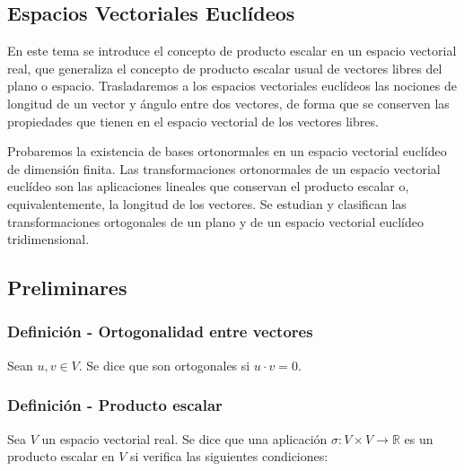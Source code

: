\documentclass[12pt, a4paper, ones, notitlepage, openany,titlepage]{article}
\begin{document}
\newpage

\begin{center}
\section{Espacios Vectoriales Euclídeos}
\end{center}

En este tema se introduce el concepto de producto escalar en un espacio vectorial real, que generaliza el concepto de producto escalar usual de vectores libres del plano o espacio. Trasladaremos a los espacios vectoriales euclídeos las nociones de longitud de un vector y ángulo entre dos vectores, de forma que se conserven las propiedades que tienen en el espacio vectorial de los vectores libres.

Probaremos la existencia de bases ortonormales en un espacio vectorial euclídeo de dimensión finita. Las transformaciones ortonormales de un espacio vectorial euclídeo son las aplicaciones lineales que conservan el producto escalar o, equivalentemente, la longitud de los vectores. Se estudian y clasifican las transformaciones ortogonales de un plano y de un espacio vectorial euclídeo tridimensional.

\subsection{Preliminares}

\subsubsection{Definición - Ortogonalidad entre vectores}
\noindent Sean $u,v \in V$. Se dice que son ortogonales si $u\cdot v = 0$.

\subsubsection{Definición - Producto escalar} Sea $V$ un espacio vectorial real. Se dice que una aplicación $\sigma: V \times V \rightarrow \mathbb{R}$ es un producto escalar en $V$ si verifica las siguientes condiciones:
\end{document}
